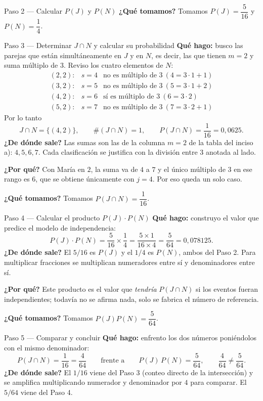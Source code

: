 \documentclass[11pt]{article}
\begin{document}
\begin{sol}
\begin{paso}{Paso 2 --- Calcular $P(J)$ y $P(N)$}
\textbf{¿Qué tomamos?} Tomamos $P(J)=\dfrac{5}{16}$ y $P(N)=\dfrac{1}{4}$.
\end{paso}

\begin{paso}{Paso 3 --- Determinar $J\cap N$ y calcular su probabilidad}
\textbf{Qué hago:} busco las parejas que están simultáneamente en $J$ y en $N$, es decir, las
que tienen $m=2$ y suma múltiplo de $3$. Reviso los cuatro elementos de $N$:
\[
\begin{array}{lll}
(2,2): & s=4 & \text{no es múltiplo de }3\ (4=3\cdot1+1)\\
(3,2): & s=5 & \text{no es múltiplo de }3\ (5=3\cdot1+2)\\
(4,2): & s=6 & \text{sí es múltiplo de }3\ (6=3\cdot2)\\
(5,2): & s=7 & \text{no es múltiplo de }3\ (7=3\cdot2+1)
\end{array}
\]
Por lo tanto
\[
J\cap N=\{(4,2)\},\qquad \#(J\cap N)=1,\qquad P(J\cap N)=\frac{1}{16}=0{,}0625 .
\]
\textbf{¿De dónde sale?} Las sumas son las de la columna $m=2$ de la tabla del inciso a):
$4,5,6,7$. Cada clasificación se justifica con la división entre $3$ anotada al lado.

\textbf{¿Por qué?} Con María en $2$, la suma va de $4$ a $7$ y el único múltiplo de $3$ en ese
rango es $6$, que se obtiene únicamente con $j=4$. Por eso queda un solo caso.

\textbf{¿Qué tomamos?} Tomamos $P(J\cap N)=\dfrac{1}{16}$.
\end{paso}

\begin{paso}{Paso 4 --- Calcular el producto $P(J)\cdot P(N)$}
\textbf{Qué hago:} construyo el valor que predice el modelo de independencia:
\[
P(J)\cdot P(N)=\frac{5}{16}\times\frac{1}{4}=\frac{5\times 1}{16\times 4}=\frac{5}{64}
=0{,}078125 .
\]
\textbf{¿De dónde sale?} El $5/16$ es $P(J)$ y el $1/4$ es $P(N)$, ambos del Paso 2. Para
multiplicar fracciones se multiplican numeradores entre sí y denominadores entre sí.

\textbf{¿Por qué?} Este producto es el valor que \emph{tendría} $P(J\cap N)$ si los eventos
fueran independientes; todavía no se afirma nada, solo se fabrica el número de referencia.

\textbf{¿Qué tomamos?} Tomamos $P(J)P(N)=\dfrac{5}{64}$.
\end{paso}

\begin{paso}{Paso 5 --- Comparar y concluir}
\textbf{Qué hago:} enfrento los dos números poniéndolos con el mismo denominador:
\[
P(J\cap N)=\frac{1}{16}=\frac{4}{64}
\qquad\text{frente a}\qquad
P(J)\,P(N)=\frac{5}{64},
\qquad \frac{4}{64}\neq\frac{5}{64}.
\]
\textbf{¿De dónde sale?} El $1/16$ viene del Paso 3 (conteo directo de la intersección) y se
amplifica multiplicando numerador y denominador por $4$ para comparar. El $5/64$ viene del
Paso 4.


\end{paso}
\end{sol}
\end{document}
